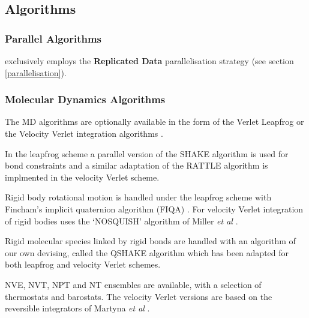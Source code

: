 \subsection{Algorithms}

\subsubsection{Parallel Algorithms}

\D{} exclusively employs the {\bf Replicated
  Data} parallelisation strategy
\cite{smith-94a,smith-94b} (see section \ref{parallelisation}).

\subsubsection{Molecular Dynamics Algorithms}

The \D{} MD algorithms are optionally available in the
form of the Verlet Leapfrog or the
Velocity Verlet integration
algorithms \cite{allen-89a}.

In the leapfrog scheme a parallel version of the SHAKE
algorithm \cite{ryckaert-77a,smith-94b} is used
for bond constraints and a similar adaptation
of the RATTLE algorithm \cite{andersen-83a} is
implmented in the velocity Verlet scheme.

Rigid body rotational motion  is handled under the
leapfrog scheme with Fincham's implicit quaternion
algorithm (FIQA) \cite{fincham-92a}.  For
velocity Verlet integration of rigid bodies \D{} uses the `NOSQUISH'
algorithm of Miller {\em et al}  \cite{miller-02a}.

Rigid molecular species linked by rigid bonds are
handled with an algorithm of our own devising, called the QSHAKE
algorithm \cite{forester-96a} which has been
adapted for both leapfrog and velocity Verlet schemes.

NVE, NVT, NPT and N\mat{\sigma}T ensembles are
available, with a selection of thermostats and
barostats. The velocity Verlet versions are based on
the reversible integrators of Martyna {\em et al} \cite{martyna-96a}. 

